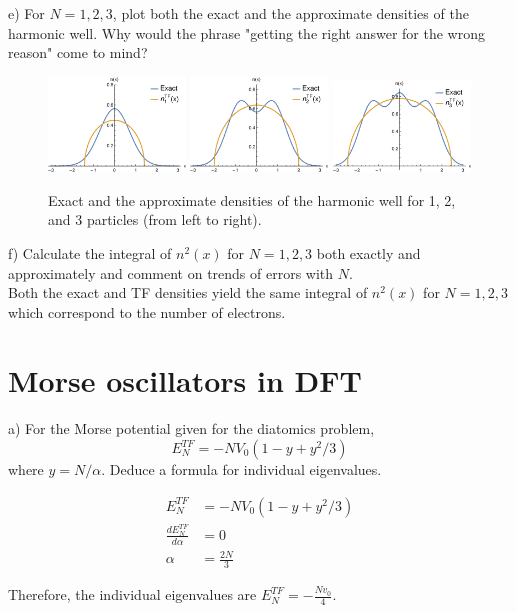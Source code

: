 \documentclass{article}
\begin{document}
\noindent e) For $N=1,2,3$, plot both the exact and the approximate densities
of the harmonic well. Why would the phrase "getting the right answer for the
wrong reason" come to mind?
\\
\begin{figure}[H]
  \centering
  \includegraphics[width=0.325\textwidth]{ho1_compare.eps}
  \includegraphics[width=0.325\textwidth]{ho2_compare.eps}
  \includegraphics[width=0.325\textwidth]{ho3_compare.eps}
  \caption{Exact and the approximate densities of the harmonic well for
    1, 2, and 3 particles (from left to right).}
\end{figure}

\noindent f) Calculate the integral of $n^2(x)$ for $N=1,2,3$ both exactly
and approximately and comment on trends of errors with $N$.
\\
 
{\color{blue} Both the exact and TF densities yield the same integral of
  $n^2(x)$ for $N=1,2,3$ which correspond to the number of electrons.
}
\pagebreak
\section*{Morse oscillators in DFT}

\noindent a) For the Morse potential given for the diatomics problem, 
$$E^{TF}_N = - N V_0 (1-y+y^2/3)$$
where $y=N/\alpha$.  Deduce a formula for individual eigenvalues.
{\color{blue}
  \begin{align}
    E^{TF}_N & = - N V_0 (1-y+y^2/3)\\
    \frac{dE^{TF}_N}{d\alpha} & = 0 \\
    \alpha & = \frac{2N}{3}
  \end{align}

  Therefore, the individual eigenvalues are $E^{TF}_N = -\frac{N v_0}{4}$.
}
\\
\end{document}
